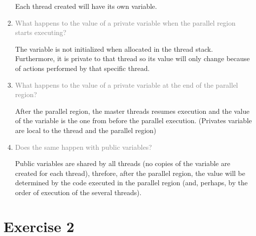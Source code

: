 \documentclass{article}
\begin{document}
\begin{enumerate}
Each thread created will have its own variable.

\item \textcolor{gray}{What happens to the value of a private variable when the parallel region starts executing?}

The variable is not initialized when allocated in the thread stack. Furthermore, it is private to that thread so its value will only change because of actions performed by that specific thread.

\item \textcolor{gray}{What happens to the value of a private variable at the end of the parallel region?}

After the parallel region, the master threads resumes execution and the value of the variable is the one from before the parallel execution. (Privates variable are local to the thread and the parallel region)

\item \textcolor{gray}{Does the same happen with public variables?}

Public variables are shared by all threads (no copies of the variable are created for each thread), threfore, after the parallel region, the value will be determined by the code executed in the parallel region (and, perhaps, by the order of execution of the several threads).
\end{enumerate}

\section{Exercise 2}
\end{document}
